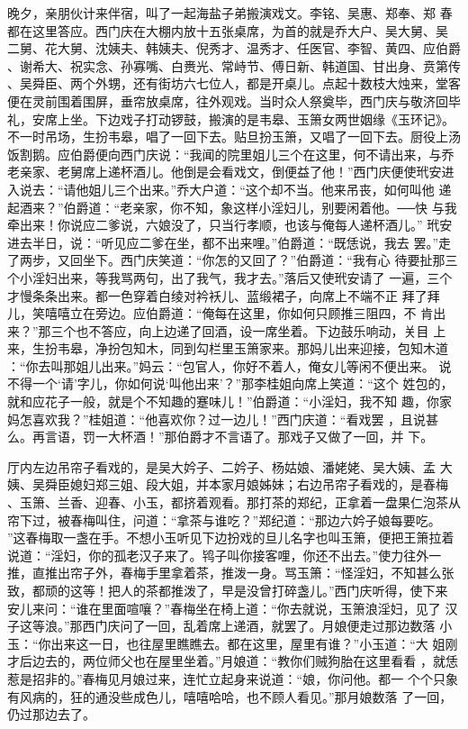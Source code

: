 晚夕，亲朋伙计来伴宿，叫了一起海盐子弟搬演戏文。李铭、吴惠、郑奉、郑
春都在这里答应。西门庆在大棚内放十五张桌席，为首的就是乔大户、吴大舅、吴
二舅、花大舅、沈姨夫、韩姨夫、倪秀才、温秀才、任医官、李智、黄四、应伯爵
、谢希大、祝实念、孙寡嘴、白赉光、常峙节、傅日新、韩道国、甘出身、贲第传
、吴舜臣、两个外甥，还有街坊六七位人，都是开桌儿。点起十数枝大烛来，堂客
便在灵前围着围屏，垂帘放桌席，往外观戏。当时众人祭奠毕，西门庆与敬济回毕
礼，安席上坐。下边戏子打动锣鼓，搬演的是韦皋、玉箫女两世姻缘《玉环记》。
不一时吊场，生扮韦皋，唱了一回下去。贴旦扮玉箫，又唱了一回下去。厨役上汤
饭割鹅。应伯爵便向西门庆说：“我闻的院里姐儿三个在这里，何不请出来，与乔
老亲家、老舅席上递杯酒儿。他倒是会看戏文，倒便益了他！”西门庆便使玳安进
入说去：“请他姐儿三个出来。”乔大户道：“这个却不当。他来吊丧，如何叫他
递起酒来？”伯爵道：“老亲家，你不知，象这样小淫妇儿，别要闲着他。──快
与我牵出来！你说应二爹说，六娘没了，只当行孝顺，也该与俺每人递杯酒儿。”
玳安进去半日，说：“听见应二爹在坐，都不出来哩。”伯爵道：“既恁说，我去
罢。”走了两步，又回坐下。西门庆笑道：“你怎的又回了？”伯爵道：“我有心
待要扯那三个小淫妇出来，等我骂两句，出了我气，我才去。”落后又使玳安请了
一遍，三个才慢条条出来。都一色穿着白绫对衿袄儿、蓝缎裙子，向席上不端不正
拜了拜儿，笑嘻嘻立在旁边。应伯爵道：“俺每在这里，你如何只顾推三阻四，不
肯出来？”那三个也不答应，向上边递了回酒，设一席坐着。下边鼓乐响动，关目
上来，生扮韦皋，净扮包知木，同到勾栏里玉箫家来。那妈儿出来迎接，包知木道
：“你去叫那姐儿出来。”妈云：“包官人，你好不着人，俺女儿等闲不便出来。
说不得一个‘请’字儿，你如何说‘叫他出来’？”那李桂姐向席上笑道：“这个
姓包的，就和应花子一般，就是个不知趣的蹇味儿！”伯爵道：“小淫妇，我不知
趣，你家妈怎喜欢我？”桂姐道：“他喜欢你？过一边儿！”西门庆道：“看戏罢
，且说甚么。再言语，罚一大杯酒！”那伯爵才不言语了。那戏子又做了一回，并
下。

厅内左边吊帘子看戏的，是吴大妗子、二妗子、杨姑娘、潘姥姥、吴大姨、孟
大姨、吴舜臣媳妇郑三姐、段大姐，并本家月娘姊妹；右边吊帘子看戏的，是春梅
、玉箫、兰香、迎春、小玉，都挤着观看。那打茶的郑纪，正拿着一盘果仁泡茶从
帘下过，被春梅叫住，问道：“拿茶与谁吃？”郑纪道：“那边六妗子娘每要吃。
”这春梅取一盏在手。不想小玉听见下边扮戏的旦儿名字也叫玉箫，便把王箫拉着
说道：“淫妇，你的孤老汉子来了。鸨子叫你接客哩，你还不出去。”使力往外一
推，直推出帘子外，春梅手里拿着茶，推泼一身。骂玉箫：“怪淫妇，不知甚么张
致，都顽的这等！把人的茶都推泼了，早是没曾打碎盏儿。”西门庆听得，使下来
安儿来问：“谁在里面喧嚷？”春梅坐在椅上道：“你去就说，玉箫浪淫妇，见了
汉子这等浪。”那西门庆问了一回，乱着席上递酒，就罢了。月娘便走过那边数落
小玉：“你出来这一日，也往屋里瞧瞧去。都在这里，屋里有谁？”小玉道：“大
姐刚才后边去的，两位师父也在屋里坐着。”月娘道：“教你们贼狗胎在这里看看
，就恁惹是招非的。”春梅见月娘过来，连忙立起身来说道：“娘，你问他。都一
个个只象有风病的，狂的通没些成色儿，嘻嘻哈哈，也不顾人看见。”那月娘数落
了一回，仍过那边去了。

